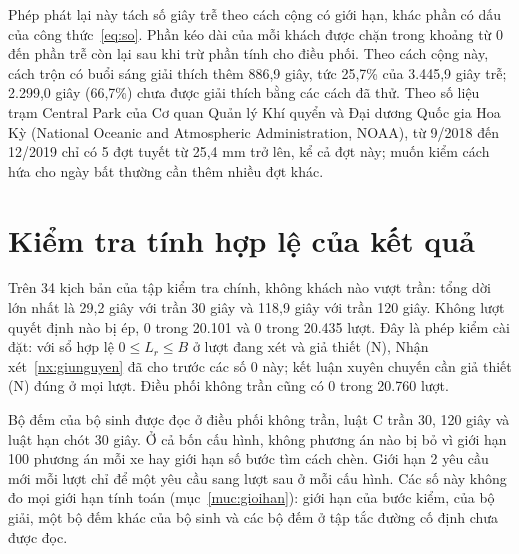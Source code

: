 Phép phát lại này tách số giây trễ theo cách cộng có giới hạn, khác phần có dấu của công thức~\eqref{eq:so}. Phần kéo
dài của mỗi khách được chặn trong khoảng từ 0 đến phần trễ còn lại sau khi trừ phần tính cho điều phối. Theo cách cộng
này, cách trộn
có buổi sáng giải thích thêm 886,9 giây, tức 25,7\% của 3.445,9 giây trễ; 2.299,0 giây (66,7\%) chưa được giải thích
bằng các cách đã thử. Theo số liệu trạm Central Park của Cơ quan Quản lý Khí quyển và Đại dương Quốc gia Hoa Kỳ
(National Oceanic and Atmospheric Administration, NOAA), từ 9/2018 đến 12/2019 chỉ có 5 đợt tuyết từ 25,4 mm trở lên,
kể cả đợt này; muốn kiểm cách hứa cho ngày bất thường cần thêm nhiều đợt khác.

\section{Kiểm tra tính hợp lệ của kết quả}
\label{muc:c4-hople}

Trên 34 kịch bản của tập kiểm tra chính, không khách nào vượt trần: tổng dời lớn nhất là 29,2 giây với trần 30 giây và
118,9 giây với trần 120 giây. Không lượt quyết định nào bị ép, 0 trong 20.101 và 0 trong 20.435 lượt. Đây là phép kiểm cài
đặt: với sổ hợp lệ $0 \le L_r \le B$ ở lượt đang xét và giả thiết (N), Nhận xét~\ref{nx:giunguyen} đã cho trước các
số 0 này; kết luận xuyên chuyến cần giả thiết (N) đúng ở mọi lượt. Điều phối không trần cũng có 0 trong 20.760 lượt.

Bộ đếm của bộ sinh được đọc ở điều phối không trần, luật C trần 30, 120 giây và luật hạn chót 30 giây. Ở cả bốn cấu
hình, không phương án nào bị bỏ vì giới hạn 100 phương án mỗi xe hay giới hạn số bước tìm cách chèn. Giới hạn 2 yêu cầu
mới mỗi lượt chỉ để một yêu cầu sang lượt sau ở mỗi cấu hình. Các số này không đo mọi giới hạn tính toán (mục~\ref{muc:gioihan}): giới hạn
của bước kiểm, của bộ giải, một bộ đếm khác của bộ sinh và các bộ đếm ở tập tắc đường cố định chưa được đọc.

